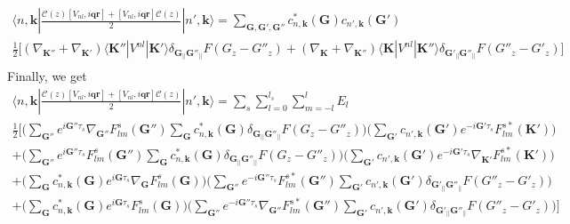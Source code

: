 \documentclass[a4paper,11pt]{report}
\renewcommand{\vec}[1]{\mathbf{#1}}
\newcommand{\bra}{\langle}
\newcommand{\ket}{\rangle}
\begin{document}
\begin{eqnarray}
 \bra n,\vec{k}|\frac{\mathcal{C}(z)[V_{nl},i\vec{q}\vec{r}]+[V_{nl},i\vec{q}\vec{r}]\mathcal{C}(z)}{2}|n',\vec{k}\ket
= \sum_{\vec{G},\vec{G'},\vec{G''}} c^*_{n,\vec{k}}(\vec{G})c_{n',\vec{k}}(\vec{G'})\nonumber\\
\frac{1}{2}\Bigg[ (\nabla_{\vec{K''}}+\nabla_{\vec{K'}})\bra \vec{K''}|V^{nl}|\vec{K'}\ket \delta_{\vec{G}_{||}\vec{G''}_{||}}  F(G_z-G''_z) + (\nabla_{\vec{K}}+\nabla_{\vec{K''}})\bra \vec{K}|V^{nl}|\vec{K''}\ket\delta_{\vec{G'}_{||}\vec{G''}_{||}} F(G''_z-G'_z) \Bigg]\nonumber\\
\end{eqnarray}
Finally, we get
\begin{eqnarray}
 \bra n,\vec{k}|\frac{\mathcal{C}(z)[V_{nl},i\vec{q}\vec{r}]+[V_{nl},i\vec{q}\vec{r}]\mathcal{C}(z)}{2}|n',\vec{k}\ket
= \sum_s\sum_{l=0}^{l_s}\sum_{m=-l}^{l}E_l \nonumber\\
\frac{1}{2}\Bigg[ \Bigg(\sum_{\vec{G''}}e^{i\vec{G''}\tau_s} \nabla_{\vec{G''}}F_{lm}^s(\vec{G''}) \sum_{\vec{G}}c^*_{n,\vec{k}}(\vec{G})\delta_{\vec{G}_{||}\vec{G''}_{||}}  F(G_z-G''_z) \Bigg) 
\Bigg( \sum_{\vec{G'}}c_{n',\vec{k}}(\vec{G'})e^{-i\vec{G'}\tau_s}F_{lm}^{s*}(\vec{K'}) \Bigg) \nonumber\\
%
+ \Bigg(\sum_{\vec{G''}}e^{i\vec{G''}\tau_s} F_{lm}^s(\vec{G''})\sum_{\vec{G}}c^*_{n,\vec{k}}(\vec{G})\delta_{\vec{G}_{||}\vec{G''}_{||}}  F(G_z-G''_z) \Bigg)
\Bigg( \sum_{\vec{G'}}c_{n',\vec{k}}(\vec{G'})e^{-i\vec{G'}\tau_s}\nabla_{\vec{K'}}F_{lm}^{s*}(\vec{K'}) \Bigg)  \nonumber\\
+ \Bigg(\sum_{\vec{G}}c^*_{n,\vec{k}}(\vec{G})e^{i\vec{G}\tau_s}\nabla_{\vec{G}}F_{lm}^s(\vec{G})\Bigg)\Bigg( \sum_{\vec{G''}}e^{-i\vec{G''}\tau_s} F_{lm}^{s*}(\vec{G''})\sum_{\vec{G'}}c_{n',\vec{k}}(\vec{G'})\delta_{\vec{G'}_{||}\vec{G''}_{||}} F(G''_z-G'_z) \Bigg) \nonumber\\
+ \Bigg(\sum_{\vec{G}}c^*_{n,\vec{k}}(\vec{G})e^{i\vec{G}\tau_s}F_{lm}^s(\vec{G}) \Bigg) \Bigg( \sum_{\vec{G''}}e^{-i\vec{G''}\tau_s}\nabla_{\vec{G''}}F_{lm}^{s*}(\vec{G''}) \sum_{\vec{G'}}c_{n',\vec{k}}(\vec{G'})\delta_{\vec{G'}_{||}\vec{G''}_{||}} F(G''_z-G'_z) \Bigg) \Bigg]\nonumber\\
\end{eqnarray}
\end{document}
